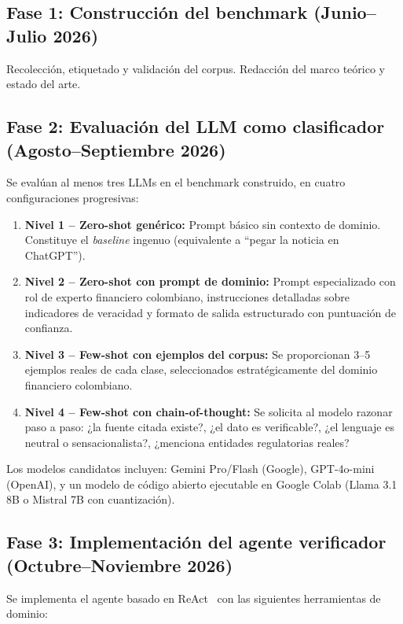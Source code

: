 \subsection{Fase 1: Construcción del benchmark (Junio--Julio 2026)}

Recolección, etiquetado y validación del corpus. Redacción del marco teórico y estado del arte.

\subsection{Fase 2: Evaluación del LLM como clasificador (Agosto--Septiembre 2026)}

Se evalúan al menos tres LLMs en el benchmark construido, en cuatro configuraciones progresivas:

\begin{enumerate}
    \item \textbf{Nivel 1 -- Zero-shot genérico:} Prompt básico sin contexto de dominio. Constituye el \textit{baseline} ingenuo (equivalente a ``pegar la noticia en ChatGPT'').
    \item \textbf{Nivel 2 -- Zero-shot con prompt de dominio:} Prompt especializado con rol de experto financiero colombiano, instrucciones detalladas sobre indicadores de veracidad y formato de salida estructurado con puntuación de confianza.
    \item \textbf{Nivel 3 -- Few-shot con ejemplos del corpus:} Se proporcionan 3--5 ejemplos reales de cada clase, seleccionados estratégicamente del dominio financiero colombiano.
    \item \textbf{Nivel 4 -- Few-shot con chain-of-thought:} Se solicita al modelo razonar paso a paso: ¿la fuente citada existe?, ¿el dato es verificable?, ¿el lenguaje es neutral o sensacionalista?, ¿menciona entidades regulatorias reales?
\end{enumerate}

Los modelos candidatos incluyen: Gemini Pro/Flash (Google), GPT-4o-mini (OpenAI), y un modelo de código abierto ejecutable en Google Colab (Llama 3.1 8B o Mistral 7B con cuantización).

\subsection{Fase 3: Implementación del agente verificador (Octubre--Noviembre 2026)}

Se implementa el agente basado en ReAct~\cite{Yao2023} con las siguientes herramientas de dominio:

